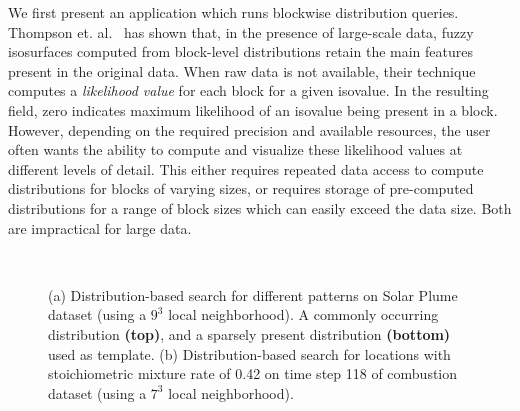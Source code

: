 %
%	
We first present an application which runs blockwise distribution queries. Thompson et. al.~\cite{Hixel11} has shown that, in the presence of large-scale data, fuzzy isosurfaces computed from block-level distributions retain the main features present in the original data. When raw data is not available, their technique computes a \emph{likelihood value} for each block for a given isovalue. In the resulting field, zero indicates maximum likelihood of an isovalue being present in a block. However, depending on the required precision and available resources, the user often wants the ability to compute and visualize these likelihood values at different levels of detail. This either requires repeated data access to compute distributions for blocks of varying sizes, or requires storage of pre-computed distributions for a range of block sizes which can easily exceed the data size. Both are impractical for large data. \\
\begin{figure}[tb]
	\centering
	\\
	\caption{ (a) Distribution-based search for different patterns on Solar Plume dataset (using a $9^3$ local neighborhood). A commonly occurring distribution {\bf (top)}, and a sparsely present distribution {\bf (bottom)} used as template. (b) Distribution-based search for locations with stoichiometric mixture rate of 0.42 on time step 118 of combustion dataset (using a $7^3$ local neighborhood).}
	\label{fig:fuzzysearch}	
	\vspace{-0.1in}
\end{figure}	

